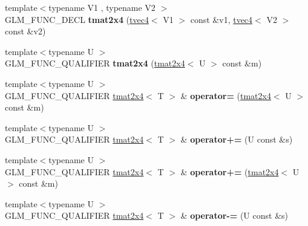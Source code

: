 \begin{DoxyCompactItemize}
\item 
\hypertarget{structglm_1_1detail_1_1tmat2x4_a10742f23a5740f8aba4b4b1f5c547afd}{}{\footnotesize template$<$typename V1 , typename V2 $>$ }\\G\+L\+M\+\_\+\+F\+U\+N\+C\+\_\+\+D\+E\+C\+L {\bfseries tmat2x4} (\hyperlink{structglm_1_1detail_1_1tvec4}{tvec4}$<$ V1 $>$ const \&v1, \hyperlink{structglm_1_1detail_1_1tvec4}{tvec4}$<$ V2 $>$ const \&v2)\label{structglm_1_1detail_1_1tmat2x4_a10742f23a5740f8aba4b4b1f5c547afd}

\item 
\hypertarget{structglm_1_1detail_1_1tmat2x4_a27118e9abda40f323b34e154177f7d00}{}{\footnotesize template$<$typename U $>$ }\\G\+L\+M\+\_\+\+F\+U\+N\+C\+\_\+\+Q\+U\+A\+L\+I\+F\+I\+E\+R {\bfseries tmat2x4} (\hyperlink{structglm_1_1detail_1_1tmat2x4}{tmat2x4}$<$ U $>$ const \&m)\label{structglm_1_1detail_1_1tmat2x4_a27118e9abda40f323b34e154177f7d00}

\item 
\hypertarget{structglm_1_1detail_1_1tmat2x4_a89ab55f218d6c59c5573b8f4968dfafb}{}{\footnotesize template$<$typename U $>$ }\\G\+L\+M\+\_\+\+F\+U\+N\+C\+\_\+\+Q\+U\+A\+L\+I\+F\+I\+E\+R \hyperlink{structglm_1_1detail_1_1tmat2x4}{tmat2x4}$<$ T $>$ \& {\bfseries operator=} (\hyperlink{structglm_1_1detail_1_1tmat2x4}{tmat2x4}$<$ U $>$ const \&m)\label{structglm_1_1detail_1_1tmat2x4_a89ab55f218d6c59c5573b8f4968dfafb}

\item 
\hypertarget{structglm_1_1detail_1_1tmat2x4_ac3de700084606c06f488205205b098d7}{}{\footnotesize template$<$typename U $>$ }\\G\+L\+M\+\_\+\+F\+U\+N\+C\+\_\+\+Q\+U\+A\+L\+I\+F\+I\+E\+R \hyperlink{structglm_1_1detail_1_1tmat2x4}{tmat2x4}$<$ T $>$ \& {\bfseries operator+=} (U const \&s)\label{structglm_1_1detail_1_1tmat2x4_ac3de700084606c06f488205205b098d7}

\item 
\hypertarget{structglm_1_1detail_1_1tmat2x4_a5ec50904e19b0a0eebd657e2bdc9b335}{}{\footnotesize template$<$typename U $>$ }\\G\+L\+M\+\_\+\+F\+U\+N\+C\+\_\+\+Q\+U\+A\+L\+I\+F\+I\+E\+R \hyperlink{structglm_1_1detail_1_1tmat2x4}{tmat2x4}$<$ T $>$ \& {\bfseries operator+=} (\hyperlink{structglm_1_1detail_1_1tmat2x4}{tmat2x4}$<$ U $>$ const \&m)\label{structglm_1_1detail_1_1tmat2x4_a5ec50904e19b0a0eebd657e2bdc9b335}

\item 
\hypertarget{structglm_1_1detail_1_1tmat2x4_a93d72c7332cb0753c735e00c20a257c1}{}{\footnotesize template$<$typename U $>$ }\\G\+L\+M\+\_\+\+F\+U\+N\+C\+\_\+\+Q\+U\+A\+L\+I\+F\+I\+E\+R \hyperlink{structglm_1_1detail_1_1tmat2x4}{tmat2x4}$<$ T $>$ \& {\bfseries operator-\/=} (U const \&s)\label{structglm_1_1detail_1_1tmat2x4_a93d72c7332cb0753c735e00c20a257c1}


\end{DoxyCompactItemize}
